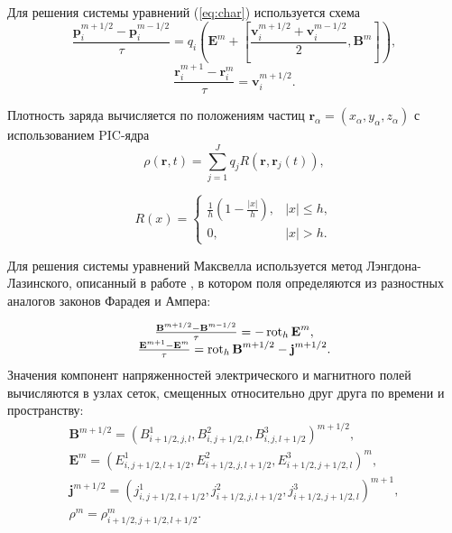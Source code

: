 Для решения системы уравнений (\ref{eq:char}) используется схема
$$
\frac{{\textbf{p}}^{m+1/2}_{i}-{\textbf{p}}^{m-1/2}_{i}}{\tau}=q_{i}\left({\textbf{E}}^m+\left[\frac{{\textbf{v}}^{m+1/2}_{i}+{\textbf{v}}^{m-1/2}_{i}}{2},{\textbf{B}}^m \right] \right),
$$
$$
\frac{{\textbf{r}}_{i}^{m+1}-{\textbf{r}}_{i}^{m}}{\tau}={\textbf{v}}^{m+1/2}_{i}.
$$


Плотность заряда вычисляется по положениям частиц ${\textbf{r}}_\alpha=(x_\alpha,y_\alpha,z_\alpha)$ с использованием PIC-ядра 
$$
\rho({\textbf{r}}, t)=\sum_{j=1}^J q_{j} R({\textbf{r}}, {\textbf{r}}_{j}(t)),
$$

\begin{equation}
R(x)=\left\{
\begin{array}{ll}
\displaystyle \frac{1}{h}\left(1-\frac{|x|}{h}\right), & |x|\leq h, \\ 0, & |x|>h.
\end{array} \right.
\end{equation}

Для решения системы уравнений Максвелла используется метод Лэнгдона-Лазинского, описанный в работе \cite{lasin}, в котором поля определяются из разностных аналогов законов Фарадея и Ампера:

\begin{equation}
\begin{array}{c}
\frac{{\textbf{B}}^{m+1/2}-{\textbf{B}}^{m-1/2}}{\tau}=-\mathop{\mathrm{rot}}\nolimits_h {\textbf{E}}^m,
\\
\frac{{\textbf{E}}^{m+1}-{\textbf{E}}^m}{\tau}=\mathop{\mathrm{rot}}\nolimits_h {\textbf{B}}^{m+1/2} - {\textbf{j}}^{m+1/2}.
\end{array}
\label{FDTD}
\end{equation}
Значения компонент напряженностей электрического и магнитного полей вычисляются в узлах сеток, смещенных относительно друг друга по времени и пространству:
\begin{equation}
\label{eq:BE}
\begin{array}{c}


{\textbf{B}}^{m+1/2}=(B^1_{i+1/2,j,l}, B^2_{i,j+1/2,l}, B^3_{i,j,l+1/2})^{m+1/2},
\\
{\textbf{E}}^{m}=(E^1_{i,j+1/2,l+1/2}, E^2_{i+1/2,j,l+1/2}, E^3_{i+1/2,j+1/2,l})^m,
\\
{\textbf{j}}^{m+1/2}=(j^1_{i,j+1/2,l+1/2},j^2_{i+1/2,j,l+1/2},j^3_{i+1/2,j+1/2,l})^{m+1},
\\
\rho^m=\rho^m_{i+1/2,j+1/2,l+1/2}. 
\end{array}
\end{equation}

